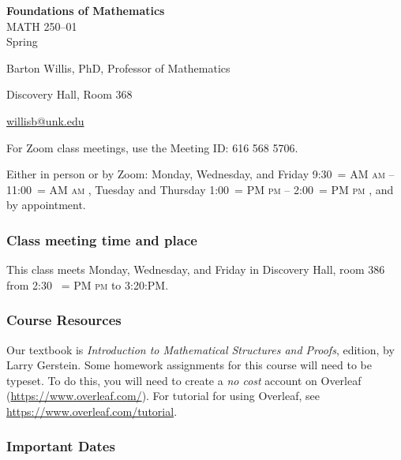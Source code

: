 \documentclass[12pt]{article}
\makeatletter
\newcounter{ex}\setcounter{ex}{0}
\renewenvironment{description}[0]{\begin{compactdesc}}{\end{compactdesc}}
\DeclareRobustCommand{\maybefakesc}[1]{%
  \ifnum\pdfstrcmp{\f@series}{\bfdefault}=\z@
    {\fontsize{\dimexpr0.8\dimexpr\f@size pt\relax}{0}\selectfont\uppercase{#1}}%
  \else
    \textsc{#1}%
  \fi
}
\newcommand\AM{\,\maybefakesc{am}\xspace}
\newcommand\PM{\,\maybefakesc{pm}\xspace}
\newcommand{\coursename}{Foundations of Mathematics}
\newcommand{\coursenumber}{MATH 250}
\newcommand{\sectionnumber}{01}
\newcommand{\term}{Spring }
\newcommand{\room}{Discovery Hall, room 386}
\newcommand{\meetingtime}{This class meets Monday, Wednesday, and Friday in \room \/  from 2:30 \PM to 3:20:PM.}
\newcommand{\officehours}{Either in person or by Zoom: Monday, Wednesday, and Friday 9:30\AM -- 11:00\AM,
    Tuesday and Thursday 1:00\PM -- 2:00\PM, and by appointment.}
\makeatother
\begin{document}
\cleanlookdateon%
\shortdate
\printyearoff
\large
\begin{center}
    \textbf{\coursename}  \\
    {\coursenumber--\sectionnumber} \\
     {\term \the\year} \\
\end{center}

\vskip0.25in
\normalsize


\begin{center}
\begin{description}
    \item[Instructor:] Barton Willis, PhD, Professor of Mathematics
    \item[Office:]  Discovery Hall, Room 368
    \item[\phone:]   
    \item[\Email:]    \href{mailto:willisb@unk.edu}{willisb@unk.edu}
    \item[Zoom for classes:] For Zoom class meetings, use the Meeting ID: 616 568 5706. 
    \item[Office Hours:] \officehours
  \end{description}
\end{center}

\subsubsection*{Class meeting time and place}

\meetingtime



\subsubsection*{Course Resources}

\noindent Our textbook is \emph{Introduction to Mathematical Structures and Proofs},  edition,  by  Larry Gerstein.
Some homework assignments for this course will need to be typeset. To do this, you will need to create a \emph{no cost} 
account on Overleaf (\url{https://www.overleaf.com/}).   For  tutorial for using Overleaf, see \url{https://www.overleaf.com/tutorial}.



\subsubsection*{Important Dates}
\end{document}
